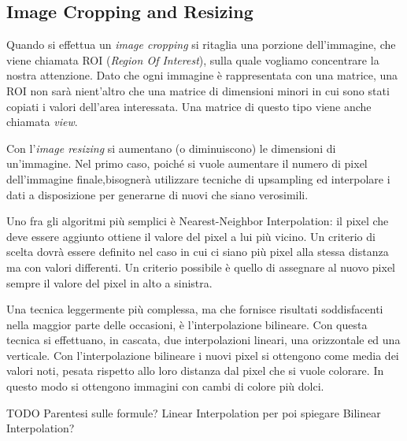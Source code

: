 \clearpage
\subsection {Image Cropping and Resizing}
Quando si effettua un \textit{image cropping} si ritaglia una porzione dell'immagine, che viene chiamata ROI (\textit{Region Of Interest}), sulla quale vogliamo concentrare la nostra attenzione.
Dato che ogni immagine è rappresentata con una matrice, una ROI non sarà nient'altro che una matrice di dimensioni minori in cui sono stati copiati i valori dell'area interessata.
Una matrice di questo tipo viene anche chiamata \textit{view}.

Con l'\textit{image resizing} si aumentano (o diminuiscono) le dimensioni di un'immagine.
Nel primo caso, poiché si vuole aumentare il numero di pixel dell'immagine finale,bisognerà utilizzare tecniche di upsampling ed interpolare i dati a disposizione per generarne di nuovi che siano verosimili.

Uno fra gli algoritmi più semplici è Nearest-Neighbor Interpolation:
il pixel che deve essere aggiunto ottiene il valore del pixel a lui più vicino.
Un criterio di scelta dovrà essere definito nel caso in cui ci siano più pixel alla stessa distanza ma con valori differenti.
Un criterio possibile è quello di assegnare al nuovo pixel sempre il valore del pixel in alto a sinistra.

Una tecnica leggermente più complessa, ma che fornisce risultati soddisfacenti nella maggior parte delle occasioni, è l'interpolazione bilineare.
Con questa tecnica si effettuano, in cascata, due interpolazioni lineari, una orizzontale ed una verticale.
Con l'interpolazione bilineare i nuovi pixel si ottengono come media dei valori noti, pesata rispetto allo loro distanza dal pixel che si vuole colorare.
In questo modo si ottengono immagini con cambi di colore più dolci.

TODO
Parentesi sulle formule?
Linear Interpolation
per poi spiegare Bilinear Interpolation?


